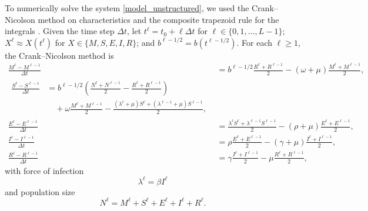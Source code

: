 \documentclass{jpmarticle}
\let\subequationsorig\subequations%
\let\endsubequationsorig\endsubequations%
\renewenvironment{subequations}{
  \subequationsorig
  \renewcommand{\theequation}{\theparentequation.\arabic{equation}}
}{
  \endsubequationsorig
}
\begin{document}
\begin{subequations}
  To numerically solve the system \eqref{model_unstructured}, we used
  the Crank--Nicolson method on characteristics and the composite
  trapezoid rule for the integrals \autocite{milner_1992}.  Given the
  time step $\Delta t$, let
  $t^{\ell} = t_0 + \ell \Delta t$ for $\ell \in \{0, 1, \ldots, L - 1\}$;
  $X^{\ell} \approx X(t^{\ell})$ for $X \in \{M, S, E, I, R\}$;
  and $b^{\ell - 1 / 2} = b(t^{\ell - 1 / 2})$.
  For each $\ell \geq 1$, the Crank--Nicolson method is
  \begin{align}
    \frac{M^{\ell} - M^{\ell - 1}}{\Delta t}
    &=
    b^{\ell - 1 / 2}
    \frac{R^{\ell} + R^{\ell - 1}}{2}
    - (\omega + \mu)
    \frac{M^{\ell} + M^{\ell - 1}}{2},
    \\
    \begin{split}
      \frac{S^{\ell} - S^{\ell - 1}}{\Delta t}
      &=
      b^{\ell - 1 / 2}
      \left(\frac{N^{\ell} + N^{\ell - 1}}{2}
        - \frac{R^{\ell} + R^{\ell - 1}}{2}\right)
      \\ & \quad {}
      + \omega \frac{M^{\ell} + M^{\ell - 1}}{2}
      - \frac{(\lambda^{\ell} + \mu) S^{\ell}
        + (\lambda^{\ell - 1} + \mu) S^{\ell - 1}}{2},
    \end{split}
    \\
    \frac{E^{\ell} - E^{\ell - 1}}{\Delta t}
    &=
    \frac{\lambda^{\ell} S^{\ell} + \lambda^{\ell - 1} S^{\ell- 1}}{2}
    - (\rho + \mu)
    \frac{E^{\ell} + E^{\ell - 1}}{2},
    \\
    \frac{I^{\ell} - I^{\ell - 1}}{\Delta t}
    &=
    \rho \frac{E^{\ell} + E^{\ell - 1}}{2}
    - (\gamma + \mu) \frac{I^{\ell} + I^{\ell - 1}}{2},
    \\
    \frac{R^{\ell} - R^{\ell - 1}}{\Delta t}
    &=
    \gamma \frac{I^{\ell} + I^{\ell - 1}}{2}
    - \mu \frac{R^{\ell} + R^{\ell - 1}}{2},
  \end{align}
  with force of infection
  \begin{equation}
    \lambda^{\ell} = \beta I^{\ell}
  \end{equation}
  and population size
  \begin{equation}
    N^{\ell} = M^{\ell} + S^{\ell} + E^{\ell} + I^{\ell} + R^{\ell}.
  \end{equation}
\end{subequations}
\end{document}
